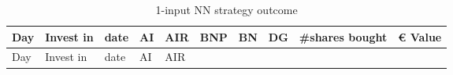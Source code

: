 \documentclass[
  11pt,
]{article}
\begin{document}
\begin{longtable}[]{@{}llllllllll@{}}
\caption{1-input NN strategy outcome}\tabularnewline
\toprule
\begin{minipage}[b]{0.05\columnwidth}\raggedright
Day\strut
\end{minipage} & \begin{minipage}[b]{0.07\columnwidth}\raggedright
Invest in\strut
\end{minipage} & \begin{minipage}[b]{0.11\columnwidth}\raggedright
date\strut
\end{minipage} & \begin{minipage}[b]{0.07\columnwidth}\raggedright
AI\strut
\end{minipage} & \begin{minipage}[b]{0.07\columnwidth}\raggedright
AIR\strut
\end{minipage} & \begin{minipage}[b]{0.07\columnwidth}\raggedright
BNP\strut
\end{minipage} & \begin{minipage}[b]{0.07\columnwidth}\raggedright
BN\strut
\end{minipage} & \begin{minipage}[b]{0.07\columnwidth}\raggedright
DG\strut
\end{minipage} & \begin{minipage}[b]{0.08\columnwidth}\raggedright
\#shares bought\strut
\end{minipage} & \begin{minipage}[b]{0.09\columnwidth}\raggedright
€ Value\strut
\end{minipage}\tabularnewline
\midrule
\endfirsthead
\toprule
\begin{minipage}[b]{0.05\columnwidth}\raggedright
Day\strut
\end{minipage} & \begin{minipage}[b]{0.07\columnwidth}\raggedright
Invest in\strut
\end{minipage} & \begin{minipage}[b]{0.11\columnwidth}\raggedright
date\strut
\end{minipage} & \begin{minipage}[b]{0.07\columnwidth}\raggedright
AI\strut
\end{minipage} & \begin{minipage}[b]{0.07\columnwidth}\raggedright
AIR\strut
\end{minipage} & \begin{minipage}[b]{0.07\columnwidth}\raggedright

\end{minipage}
\end{longtable}
\end{document}
